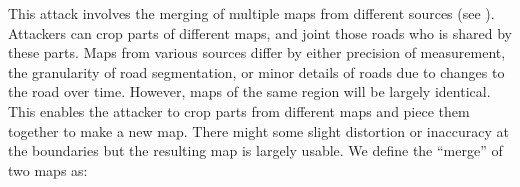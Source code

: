 This attack involves the merging of multiple maps from different sources
(see ). Attackers can crop parts of different maps, and
joint those roads who is shared by these parts. 
Maps from various sources differ by either precision of measurement, 
the granularity of road segmentation, 
or minor details of roads due to changes to the road
over time. However, maps of the same region will be largely identical.
This enables the attacker to crop parts from different maps and piece
them together to make a new map. There might some slight distortion or
inaccuracy at the boundaries but the resulting map is largely usable.
We define the ``merge'' of two maps as:

